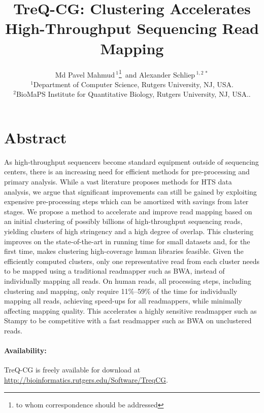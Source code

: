 \documentclass[a4paper]{article}
\begin{document}
\title{TreQ-CG: Clustering Accelerates High-Throughput Sequencing Read Mapping}

\author[Mahmud and Schliep]{Md Pavel Mahmud\,$^{1}$\footnote{to whom correspondence should be addressed}\, and Alexander Schliep\,$^{1,2\,*}$ \\
$^1$Department of Computer Science, Rutgers University, NJ, USA.\\
$^2$BioMaPS Institute for Quantitative Biology, Rutgers University, NJ, USA..}


\maketitle


\section{Abstract}

  As high-throughput sequencers become standard
  equipment outside of sequencing centers, there is an increasing need
  for efficient methods for pre-processing
  and
  primary analysis.
  While a vast literature proposes methods for
  HTS data analysis, we argue that significant improvements can
  still be gained by
  exploiting expensive pre-processing steps which can be amortized with
  savings from later stages.
  We propose a method
  to accelerate and improve read mapping
  based on an initial
  clustering of possibly billions of high-throughput sequencing reads,
  yielding clusters of high stringency and a high degree of overlap.
  This clustering improves on the state-of-the-art in running time
  for small datasets and, for the first time, makes
  clustering high-coverage human libraries feasible.
  Given the
  efficiently
  computed clusters, only one representative read
  from each cluster needs to be mapped using a traditional readmapper
  such as BWA, instead of individually mapping all reads.
        On human reads, all processing
  steps, including clustering and mapping, only require 11\%--59\% of the
  time for individually mapping all reads,
  achieving speed-ups for all readmappers,
  while minimally affecting mapping quality.
  This accelerates a
  highly sensitive readmapper such as Stampy to be competitive with
  a fast readmapper such as BWA on unclustered reads.

\paragraph{Availability:}
        TreQ-CG is freely available for download at
  \url{http://bioinformatics.rutgers.edu/Software/TreqCG}.
\end{document}

